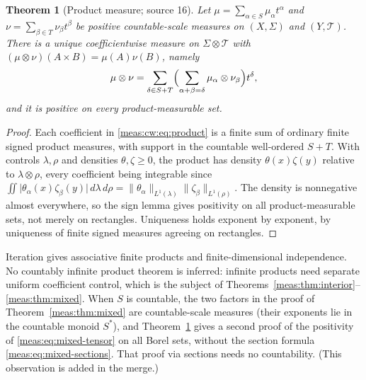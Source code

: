 \documentclass[11pt]{article}
\numberwithin{equation}{section}
\newtheorem{theorem}{Theorem}[section]
\theoremstyle{definition}
\theoremstyle{remark}
\newcommand{\norm}[1]{\lVert#1\rVert}
\newcommand{\abs}[1]{\lvert#1\rvert}
\begin{document}
\begin{theorem}[Product measure; source 16]\label{meas:cw:thm:product}
Let $\mu=\sum_{\alpha\in S}\mu_\alpha t^\alpha$ and $\nu=\sum_{\beta\in T}\nu_\beta t^\beta$ be positive
countable-scale measures on $(X,\Sigma)$ and $(Y,\mathcal T)$. There is a unique
coefficientwise measure on $\Sigma\otimes\mathcal T$ with
$(\mu\otimes\nu)(A\times B)=\mu(A)\nu(B)$, namely
\begin{equation}\label{meas:cw:eq:product}
 \mu\otimes\nu=\sum_{\delta\in S+T}\Bigl(\sum_{\alpha+\beta=\delta}\mu_\alpha\otimes\nu_\beta\Bigr)t^\delta ,
\end{equation}
and it is positive on every product-measurable set.
\end{theorem}
\begin{proof}
Each coefficient in \eqref{meas:cw:eq:product} is a finite sum of ordinary finite
signed product measures, with support in the countable well-ordered $S+T$. With
controls $\lambda,\rho$ and densities $\theta,\zeta\ge0$, the product has density
$\theta(x)\zeta(y)$ relative to $\lambda\otimes\rho$, every coefficient being integrable
since $\iint\abs{\theta_\alpha(x)\zeta_\beta(y)}\,d\lambda\,d\rho=
\norm{\theta_\alpha}_{L^1(\lambda)}\norm{\zeta_\beta}_{L^1(\rho)}$. The density is nonnegative
almost everywhere, so the sign lemma gives positivity on all product-measurable
sets, not merely on rectangles. Uniqueness holds exponent by exponent, by
uniqueness of finite signed measures agreeing on rectangles.
\end{proof}

Iteration gives associative finite products and finite-dimensional
independence. No countably infinite product theorem is inferred: infinite
products need separate uniform coefficient control, which is the subject of
Theorems~\ref{meas:thm:interior}--\ref{meas:thm:mixed}. When $S$ is countable, the
two factors in the proof of Theorem~\ref{meas:thm:mixed} are countable-scale
measures (their exponents lie in the countable monoid $S^*$), and
Theorem~\ref{meas:cw:thm:product} gives a second proof of the positivity of
\eqref{meas:eq:mixed-tensor} on all Borel sets, without the section formula
\eqref{meas:eq:mixed-sections}. That proof via sections needs no countability.
(This observation is added in the merge.)
\end{document}

